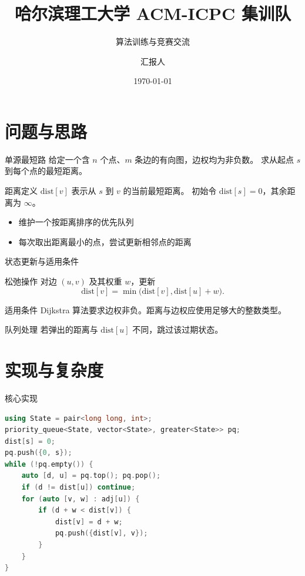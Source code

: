 \documentclass[aspectratio=169]{beamer}
\title[算法训练与竞赛交流]{哈尔滨理工大学 ACM-ICPC 集训队}
\subtitle{算法训练与竞赛交流}
\author[ACM-ICPC]{汇报人}
\institute[哈理工集训队]{哈尔滨理工大学 ACM-ICPC 集训队}
\date{\today}
\begin{document}
\begin{frame}
  \titlepage
  \begin{figure}[htpb]
    \centering
    \hrbustlogo
  \end{figure}
\end{frame}

\begin{frame}
  \tableofcontents
\end{frame}

\section{问题与思路}

\begin{frame}{单源最短路}
  给定一个含 \(n\) 个点、\(m\) 条边的有向图，边权均为非负数。
  求从起点 \(s\) 到每个点的最短距离。
  \begin{block}{距离定义}
    \(\mathrm{dist}[v]\) 表示从 \(s\) 到 \(v\) 的当前最短距离。
    初始令 \(\mathrm{dist}[s]=0\)，其余距离为 \(\infty\)。
  \end{block}
  \begin{itemize}
    \item 维护一个按距离排序的优先队列
    \item 每次取出距离最小的点，尝试更新相邻点的距离
  \end{itemize}
\end{frame}

\begin{frame}{状态更新与适用条件}
  \begin{block}{松弛操作}
    对边 \((u,v)\) 及其权重 \(w\)，更新
    \[
      \mathrm{dist}[v] = \min\bigl(\mathrm{dist}[v],\mathrm{dist}[u]+w\bigr).
    \]
  \end{block}
  \begin{alertblock}{适用条件}
    Dijkstra 算法要求边权非负。距离与边权应使用足够大的整数类型。
  \end{alertblock}
  \begin{exampleblock}{队列处理}
    若弹出的距离与 \(\mathrm{dist}[u]\) 不同，跳过该过期状态。
  \end{exampleblock}
\end{frame}

\section{实现与复杂度}

\begin{frame}[fragile]{核心实现}
  \begin{lstlisting}[language=C++,basicstyle=\ttfamily\footnotesize]
using State = pair<long long, int>;
priority_queue<State, vector<State>, greater<State>> pq;
dist[s] = 0;
pq.push({0, s});
while (!pq.empty()) {
    auto [d, u] = pq.top(); pq.pop();
    if (d != dist[u]) continue;
    for (auto [v, w] : adj[u]) {
        if (d + w < dist[v]) {
            dist[v] = d + w;
            pq.push({dist[v], v});
        }
    }
}
  \end{lstlisting}
\end{frame}
\end{document}
